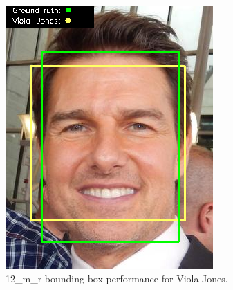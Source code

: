 \documentclass{l4proj}
\begin{document}
\begin{appendices}
\begin{figure}[h!]
  \centering
  \begin{minipage}{0.49\textwidth}
    \centering
     \includegraphics[width=\textwidth]{images/appendix/viola/12.png}
    \caption{12\_m\_r bounding box performance for Viola-Jones.}
    \label{whoopi_result}
  \end{minipage}
    \hfill
    \begin{minipage}{0.49\textwidth}
    \centering

\end{minipage}
\end{figure}
\end{appendices}
\end{document}
